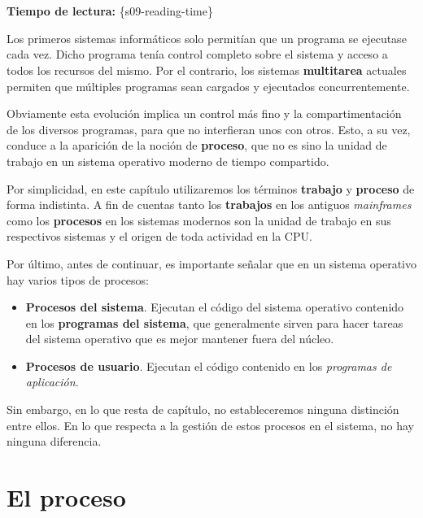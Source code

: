 \section{}

\textbf{Tiempo de lectura:} \{s09-reading-time\}

Los primeros sistemas informáticos solo permitían que un programa se
ejecutase cada vez. Dicho programa tenía control completo sobre el
sistema y acceso a todos los recursos del mismo. Por el contrario, los
sistemas \textbf{multitarea} actuales permiten que múltiples programas
sean cargados y ejecutados concurrentemente.

Obviamente esta evolución implica un control más fino y la
compartimentación de los diversos programas, para que no interfieran
unos con otros. Esto, a su vez, conduce a la aparición de la noción de
\textbf{{}proceso}, que no es sino la unidad de trabajo en un sistema
operativo moderno de tiempo compartido.

Por simplicidad, en este capítulo utilizaremos los términos
\textbf{trabajo} y \textbf{proceso} de forma indistinta. A fin de
cuentas tanto los \textbf{trabajos} en los antiguos \emph{mainframes}
como los \textbf{procesos} en los sistemas modernos son la unidad de
trabajo en sus respectivos sistemas y el origen de toda actividad en la
CPU.

Por último, antes de continuar, es importante señalar que en un sistema
operativo hay varios tipos de procesos:

\begin{itemize}
\item
  \textbf{Procesos del sistema}{}. Ejecutan el código del sistema
  operativo contenido en los \textbf{programas del sistema}, que
  generalmente sirven para hacer tareas del sistema operativo que es
  mejor mantener fuera del núcleo.
\item
  \textbf{Procesos de usuario}{}. Ejecutan el código contenido en los
  \emph{programas de aplicación}.
\end{itemize}

Sin embargo, en lo que resta de capítulo, no estableceremos ninguna
distinción entre ellos. En lo que respecta a la gestión de estos
procesos en el sistema, no hay ninguna diferencia.

\section{El proceso}\label{_el_proceso}

